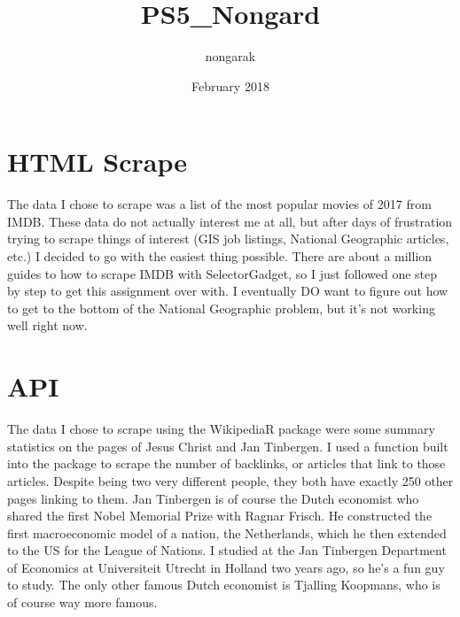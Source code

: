 \documentclass{article}
\title{PS5_Nongard}
\author{nongarak }
\date{February 2018}
\begin{document}
\maketitle

\section{HTML Scrape}
The data I chose to scrape was a list of the most popular movies of 2017 from IMDB. These data do not actually interest me at all, but after days of frustration trying to scrape things of interest (GIS job listings, National Geographic articles, etc.) I decided to go with the easiest thing possible. There are about a million guides to how to scrape IMDB with SelectorGadget, so I just followed one step by step to get this assignment over with. I eventually DO want to figure out how to get to the bottom of the National Geographic problem, but it's not working well right now. 

\section{API}
The data I chose to scrape using the WikipediaR package were some summary statistics on the pages of Jesus Christ and Jan Tinbergen. I used a function built into the package to scrape the number of backlinks, or articles that link to those articles. Despite being two very different people, they both have exactly 250 other pages linking to them. Jan Tinbergen is of course the Dutch economist who shared the first Nobel Memorial Prize with Ragnar Frisch. He constructed the first macroeconomic model of a nation, the Netherlands, which he then extended to the US for the League of Nations. I studied at the Jan Tinbergen Department of Economics at Universiteit Utrecht in Holland two years ago, so he's a fun guy to study. The only other famous Dutch economist is Tjalling Koopmans, who is of course way more famous. 
\end{document}
